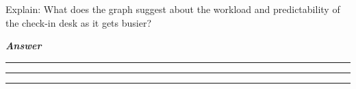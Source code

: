 \documentclass[
]{article}
\begin{document}
Explain: What does the graph suggest about the workload and
predictability of the check-in desk as it gets busier?

\textbf{\emph{Answer}}

\begin{center}\rule{0.5\linewidth}{0.5pt}\end{center}

\begin{center}\rule{0.5\linewidth}{0.5pt}\end{center}

\begin{center}\rule{0.5\linewidth}{0.5pt}\end{center}
\end{document}
